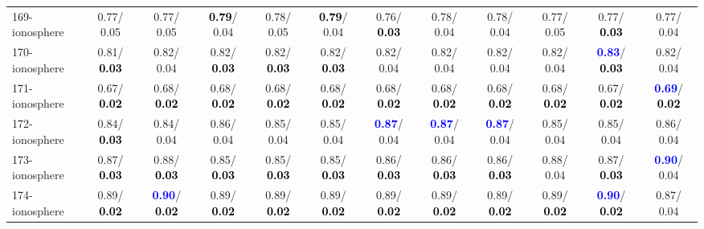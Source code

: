 \begin{table}[h]
\begin{center}
{\begin{tabular}{lc|c|c|c|c|c|c|c|c|c|c}
169-ionosphere &   0.77/  0.05 &   0.77/  0.05 & \textcolor{black}{\textbf{  0.79}}/  0.04 &   0.78/  0.05 & \textcolor{black}{\textbf{  0.79}}/  0.04 &   0.76/\textcolor{black}{\textbf{  0.03}} &   0.78/  0.04 &   0.78/  0.04 &   0.77/  0.05 &   0.77/\textcolor{black}{\textbf{  0.03}} &   0.77/  0.04 \\
170-ionosphere &   0.81/\textcolor{black}{\textbf{  0.03}} &   0.82/  0.04 &   0.82/\textcolor{black}{\textbf{  0.03}} &   0.82/\textcolor{black}{\textbf{  0.03}} &   0.82/\textcolor{black}{\textbf{  0.03}} &   0.82/  0.04 &   0.82/  0.04 &   0.82/  0.04 &   0.82/  0.04 & \textcolor{blue}{\textbf{  0.83}}/\textcolor{black}{\textbf{  0.03}} &   0.82/  0.04 \\
171-ionosphere &   0.67/\textcolor{black}{\textbf{  0.02}} &   0.68/\textcolor{black}{\textbf{  0.02}} &   0.68/\textcolor{black}{\textbf{  0.02}} &   0.68/\textcolor{black}{\textbf{  0.02}} &   0.68/\textcolor{black}{\textbf{  0.02}} &   0.68/\textcolor{black}{\textbf{  0.02}} &   0.68/\textcolor{black}{\textbf{  0.02}} &   0.68/\textcolor{black}{\textbf{  0.02}} &   0.68/\textcolor{black}{\textbf{  0.02}} &   0.67/\textcolor{black}{\textbf{  0.02}} & \textcolor{blue}{\textbf{  0.69}}/\textcolor{black}{\textbf{  0.02}} \\
172-ionosphere &   0.84/\textcolor{black}{\textbf{  0.03}} &   0.84/  0.04 &   0.86/  0.04 &   0.85/  0.04 &   0.85/  0.04 & \textcolor{blue}{\textbf{  0.87}}/  0.04 & \textcolor{blue}{\textbf{  0.87}}/  0.04 & \textcolor{blue}{\textbf{  0.87}}/  0.04 &   0.85/  0.04 &   0.85/  0.04 &   0.86/  0.04 \\
173-ionosphere &   0.87/\textcolor{black}{\textbf{  0.03}} &   0.88/\textcolor{black}{\textbf{  0.03}} &   0.85/\textcolor{black}{\textbf{  0.03}} &   0.85/\textcolor{black}{\textbf{  0.03}} &   0.85/\textcolor{black}{\textbf{  0.03}} &   0.86/\textcolor{black}{\textbf{  0.03}} &   0.86/\textcolor{black}{\textbf{  0.03}} &   0.86/\textcolor{black}{\textbf{  0.03}} &   0.88/  0.04 &   0.87/\textcolor{black}{\textbf{  0.03}} & \textcolor{blue}{\textbf{  0.90}}/  0.04 \\
174-ionosphere &   0.89/\textcolor{black}{\textbf{  0.02}} & \textcolor{blue}{\textbf{  0.90}}/\textcolor{black}{\textbf{  0.02}} &   0.89/\textcolor{black}{\textbf{  0.02}} &   0.89/\textcolor{black}{\textbf{  0.02}} &   0.89/\textcolor{black}{\textbf{  0.02}} &   0.89/\textcolor{black}{\textbf{  0.02}} &   0.89/\textcolor{black}{\textbf{  0.02}} &   0.89/\textcolor{black}{\textbf{  0.02}} &   0.89/\textcolor{black}{\textbf{  0.02}} & \textcolor{blue}{\textbf{  0.90}}/\textcolor{black}{\textbf{  0.02}} &   0.87/  0.04 \\ \hline

\end{tabular}}
\end{center}
\end{table}
